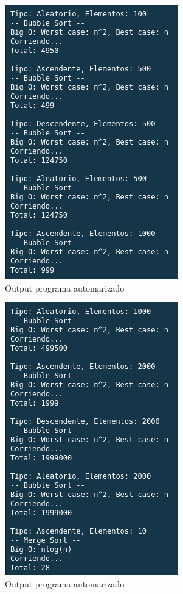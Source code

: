 \documentclass{article}
\begin{document}
		\begin{figure}[H]
			\centering
			\includegraphics[scale = 1]{images/e45.png}
			\caption{Output programa automarizado}
		\end{figure}
	
		\begin{figure}[H]
			\centering
			\includegraphics[scale = 1]{images/e46.png}
			\caption{Output programa automarizado}
		\end{figure}
	
\end{document}
